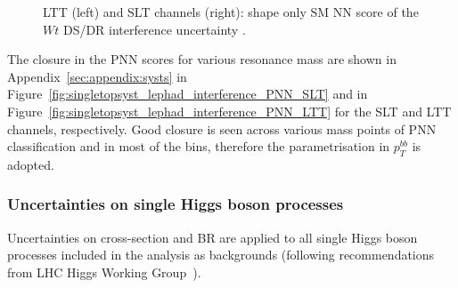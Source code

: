 \begin{figure}
\centering
{}
\caption{LTT (left) and SLT channels (right): shape only SM NN score of the $Wt$ DS/DR interference uncertainty .}
\label{fig:singletopsyst_lephad_interference_NN}
\end{figure}    
The closure in the PNN scores for various resonance mass 
are shown in Appendix~\ref{sec:appendix:systs} in 
Figure~\ref{fig:singletopsyst_lephad_interference_PNN_SLT} 
and in Figure~\ref{fig:singletopsyst_lephad_interference_PNN_LTT}
for the SLT and LTT channels, respectively. 
Good closure is seen across various mass points of PNN classification
and in most of the bins, therefore the parametrisation in $p_T^{bb}$ is adopted.




\subsubsection{Uncertainties on single Higgs boson processes}
\label{sec:DiHiggs:singlehiggssysts}
Uncertainties on cross-section and BR are applied to all single Higgs boson 
processes included in the analysis as backgrounds 
(following recommendations from LHC Higgs Working Group~\cite{dihiggs-twiki}). 

